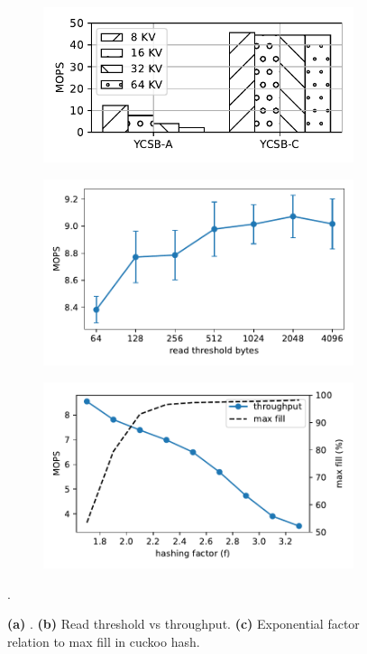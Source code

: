 \begin{figure}[t]
    \centering
    \begin{subfigure}{0.3\linewidth}
        \includegraphics[width=0.99\linewidth]{fig/entry_size.pdf}
    \end{subfigure}
    \begin{subfigure}{0.3\linewidth}
        \includegraphics[width=0.99\linewidth]{fig/read_size.pdf}
    \end{subfigure}
    \begin{subfigure}{0.3\linewidth}
        \includegraphics[width=0.99\linewidth]{fig/factor.pdf}
    \end{subfigure}.
    \vspace{-1em}
    \caption{
    \textbf{(a)} .
    \textbf{(b)} Read threshold vs throughput.
    \textbf{(c)} Exponential factor relation to max fill in cuckoo hash.
    }
    \label{fig:performance_breakdown}

\end{figure}

